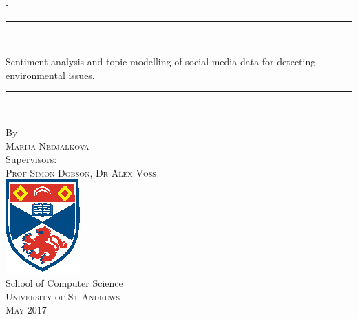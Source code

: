 \begin{titlingpage}
\begin{SingleSpace}
\calccentering{\unitlength} 
\begin{adjustwidth*}{\unitlength}{-\unitlength}
\vspace*{13mm}
\begin{center}
\rule[0.5ex]{\linewidth}{2pt}\vspace*{-\baselineskip}\vspace*{3.2pt}
\rule[0.5ex]{\linewidth}{1pt}\\[\baselineskip]
{\HUGE Sentiment analysis and topic modelling of social media data for detecting environmental issues. }\\[4mm]
\rule[0.5ex]{\linewidth}{1pt}\vspace*{-\baselineskip}\vspace{3.2pt}
\rule[0.5ex]{\linewidth}{2pt}\\
\vspace{6.5mm}
{\large By}\\
\vspace{6.5mm}
{\large\textsc{Marija Nedjalkova}}\\
\vspace{11mm}
{\large Supervisors:}\\
\vspace{6.5mm}
{\large\textsc{Prof Simon Dobson, Dr Alex Voss}}\\
\vspace{11mm}
\includegraphics[scale=2.5]{logos/StAndrewsNoText}\\
\vspace{6mm}
{\large School of Computer Science\\
\textsc{University of St Andrews}}\\
\vspace{11mm}
\vspace{9mm}
{\large\textsc{May 2017}}
\vspace{12mm}
\end{center}
\end{adjustwidth*}
\end{SingleSpace}
\end{titlingpage}